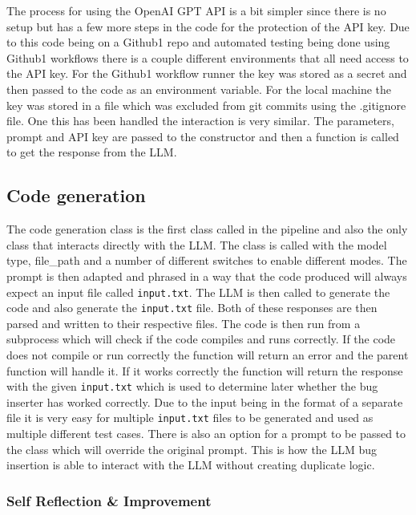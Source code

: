 \documentclass[12pt]{extarticle}
\begin{document}
The process for using the OpenAI GPT API is a bit simpler since there is no setup but has a few more steps in the code for the protection of the API key. Due to this code being on a Github1 repo and automated testing being done using Github1 workflows there is a couple different environments that all need access to the API key. For the Github1 workflow runner the key was stored as a secret and then passed to the code as an environment variable. For the local machine the key was stored in a file which was excluded from git commits using the .gitignore file. One this has been handled the interaction is very similar. The parameters, prompt and API key are passed to the constructor and then a function is called to get the response from the LLM.

\subsection{Code generation}

The code generation class is the first class called in the pipeline and also the only class that interacts directly with the LLM. The class is called with the model type, file\_path and a number of different switches to enable different modes. The prompt is then adapted and phrased in a way that the code produced will always expect an input file called \texttt{input.txt}. The LLM is then called to generate the code and also generate the \texttt{input.txt} file. Both of these responses are then parsed and written to their respective files. The code is then run from a subprocess which will check if the code compiles and runs correctly. If the code does not compile or run correctly the function will return an error and the parent function will handle it. If it works correctly the function will return the response with the given \texttt{input.txt} which is used to determine later whether the bug inserter has worked correctly. Due to the input being in the format of a separate file it is very easy for multiple \texttt{input.txt} files to be generated and used as multiple different test cases. 
There is also an option for a prompt to be passed to the class which will override the original prompt. This is how the LLM bug insertion is able to interact with the LLM without creating duplicate logic. 

\subsubsection{Self Reflection \& Improvement}
\end{document}
